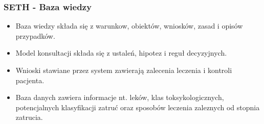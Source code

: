 \begin{frame}
\frametitle{SETH - Baza wiedzy}

\begin{itemize}
    \item Baza wiedzy składa się z warunkow, obiektów, wniosków, zasad i opisów
    przypadków.
    \item Model konsultacji składa się z ustaleń, hipotez i reguł decyzyjnych.
    \item Wnioski stawiane przez system zawierają zalecenia leczenia i kontroli
    pacjenta.
    \item Baza danych zawiera informacje nt. leków, klas toksykologicznych,
    potencjalnych klasyfikacji zatruć oraz sposobów leczenia zaleznych od
    stopnia zatrucia.
\end{itemize}


\end{frame}

